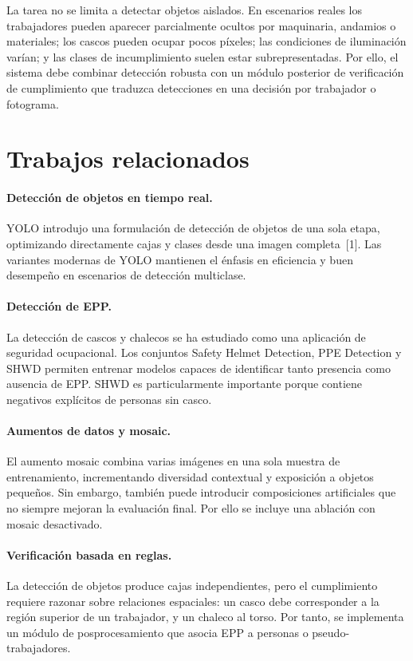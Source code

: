 \documentclass{article}
\begin{document}
La tarea no se limita a detectar objetos aislados. En escenarios reales los trabajadores pueden aparecer parcialmente ocultos por maquinaria, andamios o materiales; los cascos pueden ocupar pocos píxeles; las condiciones de iluminación varían; y las clases de incumplimiento suelen estar subrepresentadas. Por ello, el sistema debe combinar detección robusta con un módulo posterior de verificación de cumplimiento que traduzca detecciones en una decisión por trabajador o fotograma.

\section{Trabajos relacionados}
\paragraph{Detección de objetos en tiempo real.}
YOLO introdujo una formulación de detección de objetos de una sola etapa, optimizando directamente cajas y clases desde una imagen completa~[1]. Las variantes modernas de YOLO mantienen el énfasis en eficiencia y buen desempeño en escenarios de detección multiclase.

\paragraph{Detección de EPP.}
La detección de cascos y chalecos se ha estudiado como una aplicación de seguridad ocupacional. Los conjuntos Safety Helmet Detection, PPE Detection y SHWD permiten entrenar modelos capaces de identificar tanto presencia como ausencia de EPP. SHWD es particularmente importante porque contiene negativos explícitos de personas sin casco.

\paragraph{Aumentos de datos y mosaic.}
El aumento mosaic combina varias imágenes en una sola muestra de entrenamiento, incrementando diversidad contextual y exposición a objetos pequeños. Sin embargo, también puede introducir composiciones artificiales que no siempre mejoran la evaluación final. Por ello se incluye una ablación con mosaic desactivado.

\paragraph{Verificación basada en reglas.}
La detección de objetos produce cajas independientes, pero el cumplimiento requiere razonar sobre relaciones espaciales: un casco debe corresponder a la región superior de un trabajador, y un chaleco al torso. Por tanto, se implementa un módulo de posprocesamiento que asocia EPP a personas o pseudo-trabajadores.
\end{document}
